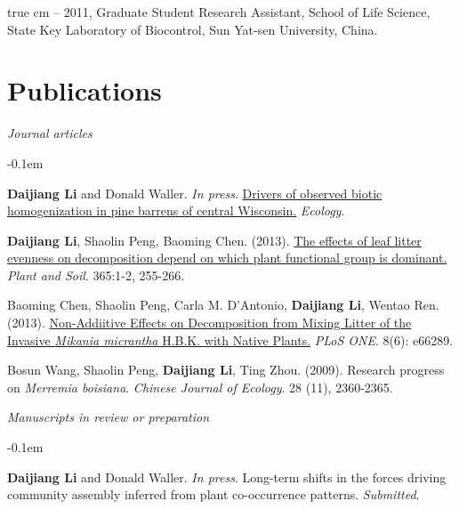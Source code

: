 \documentclass[11pt,oneside]{article}
\def\ind{\vspace{0.3em} \hangindent=1.25 true cm\hangafter=1 \noindent }
\begin{document}
\ind 2008 -- 2011, Graduate Student Research Assistant, School of Life Science, State Key Laboratory of Biocontrol, Sun Yat-sen University, China.

\section{Publications}
\noindent\emph{Journal articles}
\vspace{0.05in}
\begin{revnumerate}
\itemsep -0.1em 
	\item \textbf{Daijiang Li} and Donald Waller. \emph{In press}. \href{http://www.esajournals.org/doi/abs/10.1890/14-0893.1}{Drivers of observed biotic homogenization in pine barrens of central Wisconsin.} \emph{Ecology}.

	\item \textbf{Daijiang Li}, Shaolin Peng, Baoming Chen. (2013). \href{http://www.daijiang.name/pdf/D_Li_2012_plantsoil.pdf}{The effects of leaf litter evenness on decomposition depend on which plant functional group is dominant.} \emph{Plant and Soil}. 365:1-2, 255-266. 

	\item Baoming Chen, Shaolin Peng, Carla M. D'Antonio, \textbf{Daijiang Li}, Wentao Ren. (2013). \href{http://www.plosone.org/article/info%3Adoi%2F10.1371%2Fjournal.pone.0066289}{Non-Addiitive Effects on Decomposition from Mixing Litter of the Invasive \emph{Mikania micrantha} H.B.K. with Native Plants.} \emph{PLoS ONE}. 8(6): e66289.


	\item Bosun Wang, Shaolin Peng, \textbf{Daijiang Li}, Ting Zhou. (2009). Research progress on \emph{Merremia boisiana}. \emph{Chinese Journal of Ecology}. 28 (11), 2360-2365.
\end{revnumerate}

\noindent\emph{Manuscripts in review or preparation}
\vspace{0.05in}
\begin{revnumerate}
\itemsep -0.1em 
	\item \textbf{Daijiang Li} and Donald Waller. \emph{In press}. Long-term shifts in the forces driving community assembly inferred from plant co-occurrence patterns. \emph{Submitted}.
\end{revnumerate}
\end{document}
